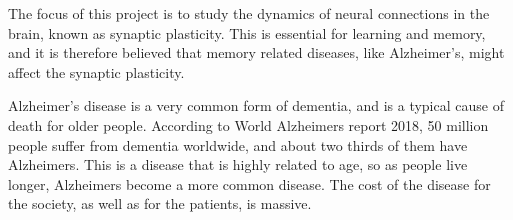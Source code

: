 





The focus of this project is to study the dynamics of neural connections in the brain, known as synaptic plasticity. This is essential for learning and memory, and it is therefore believed that memory related diseases, like Alzheimer's, might affect the synaptic plasticity. 

Alzheimer's disease is a very common form of dementia, and is a typical cause of death for older people. According to World Alzheimers report 2018, 50 million people suffer from dementia worldwide, and about two thirds of them have Alzheimers. This is a disease that is highly related to age, so as people live longer, Alzheimers become a more common disease. The cost of the disease for the society, as well as for the patients, is massive.

